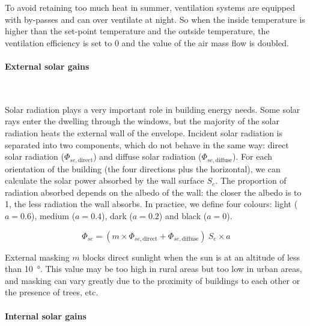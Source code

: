 \documentclass[11pt]{article}
\begin{document}
            To avoid retaining too much heat in summer, ventilation systems are equipped with by-passes and can over ventilate at night. So when the inside temperature is higher than the set-point temperature and the outside temperature, the ventilation efficiency is set to 0 and the value of the air mass flow is doubled. 


            \paragraph{External solar gains}\mbox{}\\ %
            \label{par:external_solar_gains}
            
            Solar radiation plays a very important role in building energy needs. Some solar rays enter the dwelling through the windows, but the majority of the solar radiation heats the external wall of the envelope. Incident solar radiation is separated into two components, which do not behave in the same way: direct solar radiation ($\Phi_{se,\mathrm{direct}}$) and diffuse solar radiation ($\Phi_{se,\mathrm{diffuse}}$). For each orientation of the building (the four directions plus the horizontal), we can calculate the solar power absorbed by the wall surface $S_e$. The proportion of radiation absorbed depends on the albedo of the wall: the closer the albedo is to 1, the less radiation the wall absorbs. In practice, we define four colours: light ($a=0.6$), medium ($a=0.4$), dark ($a=0.2$) and black ($a=0$). 

            \begin{equation}\label{eq:phi_e}
                \Phi_{se} = \left(m\times \Phi_{se,\mathrm{direct}} + \Phi_{se,\mathrm{diffuse}}\right)~ S_e\times a
            \end{equation}

            External masking $m$ blocks direct sunlight when the sun is at an altitude of less than \SI{10}{\degree}. This value may be too high in rural areas but too low in urban areas, and masking can vary greatly due to the proximity of buildings to each other or the presence of trees, etc. 

            \paragraph{Internal solar gains}\mbox{}\\ %
            \label{par:internal_solar_gains}
\end{document}
